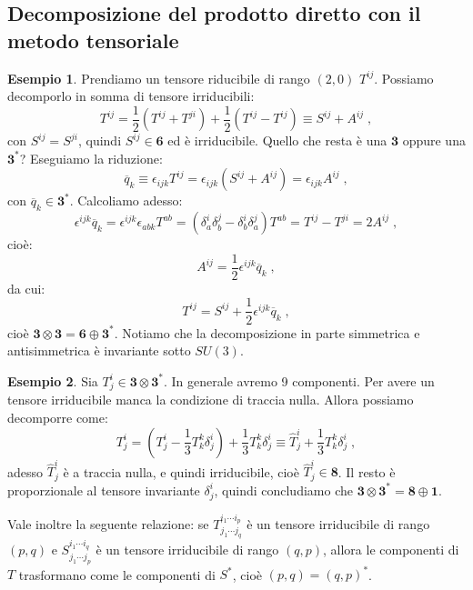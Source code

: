 \documentclass[12pt,a4paper]{article}
\theoremstyle{definition}
\newtheorem{exm}{Esempio}
\numberwithin{equation}{section}
\begin{document}
\subsection{Decomposizione del prodotto diretto con il metodo tensoriale}
\begin{exm}
Prendiamo un tensore riducibile di rango $(2,0)$ $T^{ij}$. Possiamo decomporlo in somma di tensore irriducibili:
\begin{equation}
T^{ij}=\frac{1}{2}(T^{ij}+T^{ji})+\frac{1}{2}(T^{ij}-T^{ij})\equiv S^{ij}+A^{ij}\;,
\end{equation}
con  $S^{ij}=S^{ji}$, quindi $S^{ij}\in \mathbf{6}$ ed è irriducibile. Quello che resta è una $\mathbf{3}$ oppure una  $\mathbf{3}^*$? Eseguiamo la riduzione:
$$
\overline{q}_k\equiv \epsilon_{ijk}T^{ij}=\epsilon_{ijk}(S^{ij}+A^{ij})=\epsilon_{ijk}A^{ij}\;,
$$
con $\overline{q}_k\in\mathbf{3}^*$. Calcoliamo adesso:
$$
\epsilon^{ijk}\overline{q}_k=\epsilon^{ijk}\epsilon_{abk}T^{ab}=(\delta^i_a\delta^j_b-\delta^i_b\delta^j_a)T^{ab}=T^{ij}-T^{ji}=2A^{ij}\;,
$$
cioè:
$$
A^{ij}=\frac{1}{2}\epsilon^{ijk}\overline{q}_k\;,
$$
da cui:
\begin{equation}
T^{ij}=S^{ij}+\frac{1}{2}\epsilon^{ijk}\overline{q}_k\;,
\end{equation}
cioè $\mathbf{3}\otimes\mathbf{3}=\mathbf{6}\oplus \mathbf{3}^*$. Notiamo che la decomposizione in parte simmetrica e antisimmetrica è invariante sotto $SU(3)$.
\end{exm}
\begin{exm} 
Sia $T^i_j\in \mathbf{3}\otimes \mathbf{3}^*$. In generale avremo 9 componenti. Per avere un tensore irriducibile manca la condizione di traccia nulla. Allora possiamo decomporre come:
\begin{equation}
T^i_j=\left(T^i_j-\frac{1}{3}T^k_k\delta^i_j\right)+\frac{1}{3}T^k_k\delta^i_j\equiv\hat{T}^i_j+\frac{1}{3}T^k_k\delta^i_j\;,
\end{equation}
adesso $\hat{T}^i_j$ è a traccia nulla, e quindi irriducibile, cioè $\hat{T}^i_j\in \mathbf{8}$. Il resto è proporzionale al tensore invariante $\delta^i_j$, quindi concludiamo che $\mathbf{3}\otimes\mathbf{3}^*=\mathbf{8}\oplus\mathbf{1}$.
\end{exm}
Vale inoltre la seguente relazione: se $T^{i_1\cdots i_p}_{j_1\cdots j_q}$ è un tensore irriducibile di rango $(p,q)$ e $S^{i_1\cdots i_q}_{j_1\cdots j_p}$ è un tensore irriducibile di rango $(q,p)$, allora le componenti di $T$ trasformano come le componenti di $S^*$, cioè $(p,q)=(q,p)^*$.
\cleardoublepage
\end{document}
